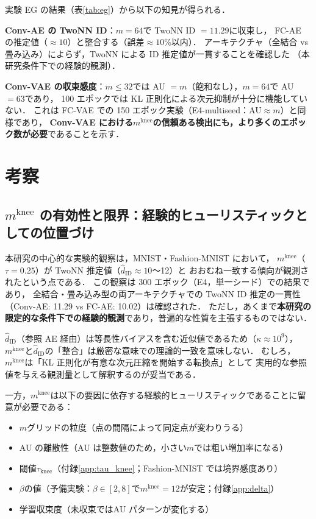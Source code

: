 \documentclass[11pt,a4paper]{jsarticle}
\newcommand{\kap}{\kappa}
\newcommand{\mknee}{m^{\mathrm{knee}}}
\begin{document}
実験 EG の結果（表\ref{tab:eg}）から以下の知見が得られる．

\textbf{Conv-AE の TwoNN ID}：$m = 64$で TwoNN ID $= 11.29$に収束し，
FC-AE の推定値（$\approx 10$）と整合する（誤差$\approx 10\%$以内）．
アーキテクチャ（全結合 vs 畳み込み）によらず，TwoNN による ID 推定値が一貫することを確認した
（本研究条件下での経験的観測）．

\textbf{Conv-VAE の収束感度}：$m \leq 32$では AU $= m$（飽和なし），$m = 64$で AU $= 63$であり，
100 エポックでは KL 正則化による次元抑制が十分に機能していない．
これは FC-VAE での 150 エポック実験（E4-multiseed：AU$\approx m$）と同様であり，
\textbf{Conv-VAE における$\mknee$の信頼ある検出にも，より多くのエポック数が必要}であることを示す．

\section{考察}\label{sec:discussion}

\subsection{$\mknee$ の有効性と限界：経験的ヒューリスティックとしての位置づけ}\label{sec:disc_mknee}

本研究の中心的な実験的観察は，MNIST・Fashion-MNIST において，
$\mknee$（$\tau = 0.25$）が TwoNN 推定値（$\hat{d}_\mathrm{ID} \approx 10$〜12）と
おおむね一致する傾向が観測されたという点である．
この観察は 300 エポック（E4，単一シード）での結果であり，
全結合・畳み込み型の両アーキテクチャでの TwoNN ID 推定の一貫性（Conv-AE: 11.29 vs FC-AE: 10.02）は確認された．
ただし，あくまで\textbf{本研究の限定的な条件下での経験的観測}であり，普遍的な性質を主張するものではない．

$\hat{d}_\mathrm{ID}$（参照 AE 経由）は等長性バイアスを含む近似値であるため（$\kap \approx 10^9$），
$\mknee$と$\hat{d}_\mathrm{ID}$の「整合」は厳密な意味での理論的一致を意味しない．
むしろ，$\mknee$は「KL 正則化が有意な次元圧縮を開始する転換点」として
実用的な参照値を与える観測量として解釈するのが妥当である．

一方，$\mknee$は以下の要因に依存する経験的ヒューリスティックであることに留意が必要である：
\begin{itemize}
  \item $m$グリッドの粒度（点の間隔によって同定点が変わりうる）
  \item AU の離散性（AU は整数値のため，小さい$m$では粗い増加率になる）
  \item 閾値$\tau_{\mathrm{knee}}$（付録\ref{app:tau_knee}；Fashion-MNIST では境界感度あり）
  \item $\beta$の値（予備実験：$\beta \in [2, 8]$で$\mknee = 12$が安定；付録\ref{app:delta}）
  \item 学習収束度（未収束ではAU パターンが変化する）
\end{itemize}
\end{document}
